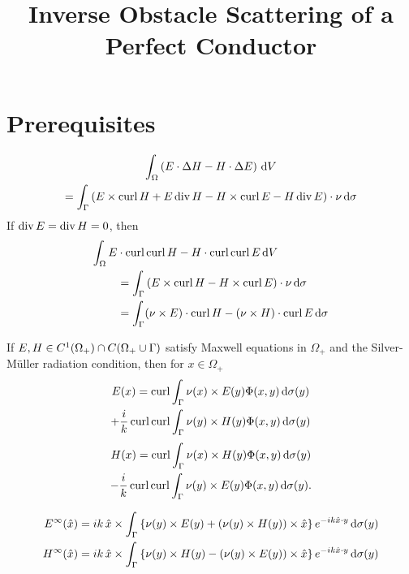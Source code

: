 
\title{Inverse Obstacle Scattering of a Perfect Conductor}
\maketitle

\section{Prerequisites}
\begin{prp}
  \begin{multline*}
    \int_{\Omega}\left(E\cdot\Delta H - H\cdot\Delta E\right)\,\text{d}V\\=\int_{\Gamma}\left(E\times\operatorname{curl} H + E\operatorname{div} H - H\times\operatorname{curl} E - H\operatorname{div} E\right)\cdot\nu\,\text{d}\sigma
  \end{multline*}
  If $\operatorname{div} E=\operatorname{div} H=0$, then
  \begin{align}\label{eq:green}
    \int_{\Omega}E&\cdot\operatorname{curl}\operatorname{curl} H - H\cdot\operatorname{curl}\operatorname{curl} E\,\text{d}V\\
    &=\int_{\Gamma}\left(E\times\operatorname{curl} H - H\times\operatorname{curl} E\right)\cdot\nu\,\text{d}\sigma\\
    &=\int_{\Gamma}(\nu\times E)\cdot\operatorname{curl} H - (\nu\times H)\cdot\operatorname{curl} E\,\text{d}\sigma
  \end{align}
\end{prp}

\begin{prp}\label{prp:chu}
  If $E, H\in C^1(\Omega_+)\cap C(\Omega_+\cup\Gamma)$ satisfy Maxwell equations in $\Omega_+$ and the Silver-M\"uller radiation condition, then for $x\in\Omega_+$
  \begin{multline*}
    E(x) = \operatorname{curl}\int_{\Gamma}\nu(x)\times E(y)\Phi(x,y)\,\text{d}\sigma(y)\\
           +\frac{i}{k}\operatorname{curl}\operatorname{curl}\int_{\Gamma}\nu(y)\times H(y)\Phi(x,y)\,\text{d}\sigma(y)
  \end{multline*}
  \begin{multline*}
    H(x) = \operatorname{curl}\int_{\Gamma}\nu(x)\times H(y)\Phi(x,y)\,\text{d}\sigma(y)\\
           -\frac{i}{k}\operatorname{curl}\operatorname{curl}\int_{\Gamma}\nu(y)\times E(y)\Phi(x,y)\,\text{d}\sigma(y).
  \end{multline*}
\end{prp}

\begin{prp}\label{prp:far}
  \begin{align*}
    E^\infty(\hat{x}) &= ik\,\hat{x}\times\int_{\Gamma}\left\{\nu(y)\times E(y)+(\nu(y)\times H(y))\times\hat{x}\right\}e^{-ik\hat{x}\cdot y}\,\text{d}\sigma(y) \\
    H^\infty(\hat{x}) &= ik\,\hat{x}\times\int_{\Gamma}\left\{\nu(y)\times H(y)-(\nu(y)\times E(y))\times\hat{x}\right\}e^{-ik\hat{x}\cdot y}\,\text{d}\sigma(y) 
  \end{align*}
\end{prp}


